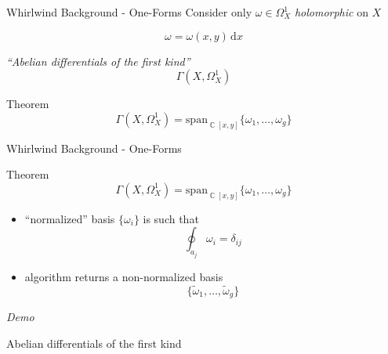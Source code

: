 \documentclass{beamer}
\DeclareMathOperator{\CC}{\mathbb{C}}
\newcommand{\dx}{\,\mathrm{d}x}
\begin{document}
\begin{frame}{Whirlwind Background - One-Forms}{}
  Consider only $\omega \in \Omega_X^1$ {\it holomorphic} on $X$

  \pause

  \[
  \omega = \omega(x,y) \dx
  \]

  \pause

  {\it ``Abelian differentials of the first kind''}
  \[
  \Gamma(X,\Omega_X^1)
  \]

  \begin{block}{Theorem}
    \[
    \Gamma(X,\Omega_X^1)
    =
    \text{span}_{\CC[x,y]} \{ \omega_1, \ldots, \omega_g \}
    \]
  \end{block}
\end{frame}


\begin{frame}{Whirlwind Background - One-Forms}{}
  \begin{block}{Theorem}
    \[
    \Gamma(X,\Omega_X^1)
    =
    \text{span}_{\CC[x,y]} \{ \omega_1, \ldots, \omega_g \}
    \]
  \end{block}
  \begin{itemize}[<+->]
  \item ``normalized'' basis $\{ \omega_i \}$ is such that
    \[
    \oint_{a_j} \omega_i = \delta_{ij}
    \]
  \item algorithm returns a non-normalized basis
    \[
    \{ \tilde{\omega}_1, \ldots, \tilde{\omega}_g \}
    \]
  \end{itemize}
\end{frame}


\begin{frame}{}{}
  \vspace{32pt}
  \begin{center}
    {\Huge \it Demo}

    \vspace{24pt}

    Abelian differentials of the first kind
  \end{center}
\end{frame}
\end{document}
